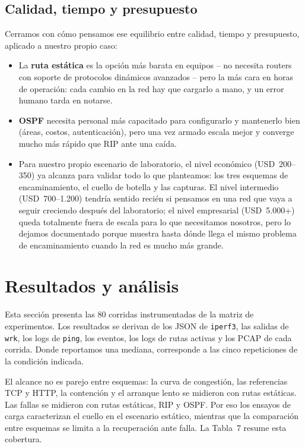 \documentclass[11pt,a4paper]{article}
\begin{document}
\subsection*{Calidad, tiempo y presupuesto}

Cerramos con c\'omo pensamos ese equilibrio entre calidad, tiempo y presupuesto, aplicado a nuestro propio caso:

\begin{itemize}
  \item La \textbf{ruta est\'atica} es la opci\'on m\'as barata en equipos -- no necesita routers con soporte de protocolos din\'amicos avanzados -- pero la m\'as cara en horas de operaci\'on: cada cambio en la red hay que cargarlo a mano, y un error humano tarda en notarse.
  \item \textbf{OSPF} necesita personal m\'as capacitado para configurarlo y mantenerlo bien (\'areas, costos, autenticaci\'on), pero una vez armado escala mejor y converge mucho m\'as r\'apido que RIP ante una ca\'ida.
  \item Para nuestro propio escenario de laboratorio, el nivel econ\'omico (USD~200--350) ya alcanza para validar todo lo que planteamos: los tres esquemas de encaminamiento, el cuello de botella y las capturas. El nivel intermedio (USD~700--1.200) tendr\'ia sentido reci\'en si pensamos en una red que vaya a seguir creciendo despu\'es del laboratorio; el nivel empresarial (USD~5.000+) queda totalmente fuera de escala para lo que necesitamos nosotros, pero lo dejamos documentado porque muestra hasta d\'onde llega el mismo problema de encaminamiento cuando la red es mucho m\'as grande.
\end{itemize}

\clearpage
\section{Resultados y an\'alisis}
\label{sec:resultados}

Esta secci\'on presenta las 80 corridas instrumentadas de la matriz de experimentos. Los resultados se derivan de los JSON de \texttt{iperf3}, las salidas de \texttt{wrk}, los logs de \texttt{ping}, los eventos, los logs de rutas activas y los PCAP de cada corrida. Donde reportamos una mediana, corresponde a las cinco repeticiones de la condici\'on indicada.

El alcance no es parejo entre esquemas: la curva de congesti\'on, las referencias TCP y HTTP, la contenci\'on y el arranque lento se midieron con rutas est\'aticas. Las fallas se midieron con rutas est\'aticas, RIP y OSPF. Por eso los ensayos de carga caracterizan el cuello en el escenario est\'atico, mientras que la comparaci\'on entre esquemas se limita a la recuperaci\'on ante falla. La Tabla~7 resume esta cobertura.
\end{document}
